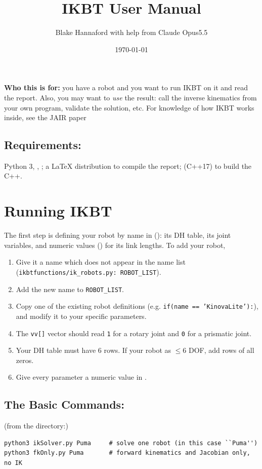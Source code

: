 \documentclass[11pt]{article}
\title{IKBT User Manual}
\author{Blake Hannaford with help from Claude Opus5.5}
\date{\today}
\begin{document}
\maketitle
\raggedright      %

\textbf{Who this is for:}  you have a robot and you want to run IKBT on it and read the report.
Also,  you
may want
to \emph{use} the result:  call the inverse kinematics from your own program,
 validate the solution, etc.  For knowledge of how IKBT works inside, see the JAIR paper

\subsection*{Requirements:}  Python 3,
, ;  a LaTeX distribution to compile the report;
 (C++17) to build the C++.
\tableofcontents

\section{Running IKBT}

The first step is defining your robot by name in 
():  its DH table, its joint variables, and numeric values
() for its link lengths.
To add your robot,

\begin{enumerate}
  \item Give it a name which does not appear in the name list ({\tt ikbtfunctions/ik\_robots.py: ROBOT\_LIST}).
  \item Add the new name to {\tt ROBOT\_LIST}.
  \item Copy one of the existing robot definitions (e.g. {\tt if(name == 'KinovaLite'):}),
  and modify it to your specific parameters.
  \item The {\tt vv[]} vector should read {\tt 1} for a rotary joint and {\tt 0} for a prismatic joint.
  \item Your DH table must have 6 rows.  If your robot as $\leq 6$ DOF, add rows of all zeros.
  \item Give every parameter a numeric value in .
\end{enumerate}


\subsection*{The Basic Commands:}
(from the  directory:)
\begin{lstlisting}
python3 ikSolver.py Puma     # solve one robot (in this case ``Puma'')
python3 fkOnly.py Puma       # forward kinematics and Jacobian only, no IK
\end{lstlisting}
\end{document}
